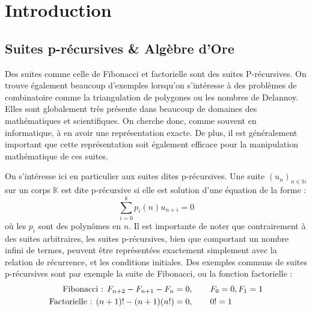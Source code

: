\documentclass[12pt]{article}
\begin{document}

\setcounter{tocdepth}{2}

\newpage
\tableofcontents
\newpage

\section{Introduction}
    \label{sec:intro}
    \subsection{Suites p-récursives \& Algèbre d'Ore}
        \label{sec:prec}
        \par Des suites comme celle de Fibonacci et factorielle sont des suites P-récursives.
        On trouve également beaucoup d'exemples lorsqu'on s'intéresse à des problèmes
        de combinatoire comme la triangulation de polygones ou les nombres de Delannoy. Elles sont
        globalement très présente dans beaucoup de domaines des mathématiques et scientifiques.
        On cherche donc, comme souvent en informatique, à en avoir une
        représentation exacte. De plus, il est généralement important que cette représentation
        soit également efficace pour la manipulation mathématique de ces suites.
        \par On s'intéresse ici en particulier aux suites dites p-récursives.
        Une suite $(u_n)_{n\in\mathbb N}$ sur un corps $\mathbb K$ est dite p-récursive
        si elle est solution d'une équation de la forme :
        \begin{equation}
            \sum_{i=0}^k p_i(n) u_{n+i} = 0
        \end{equation}
        où les $p_i$ sont des polynômes en $n$. Il est importante de noter que contrairement
        à des suites arbitraires, les suites p-récursives, bien que comportant un nombre
        infini de termes, peuvent être représentées exactement simplement
        avec la relation de récurrence, et les conditions initiales.
        Des exemples communs de suites p-récursives
        sont par exemple la suite de Fibonacci, ou la fonction factorielle :
        \begin{align*}
            \textnormal{Fibonacci : } F_{n+2} - F_{n+1} - F_n &= 0, \qquad F_0=0, F_1=1\\
            \textnormal{Factorielle : } (n+1)! - (n+1)(n!) &= 0, \qquad 0!=1
        \end{align*}
\end{document}
